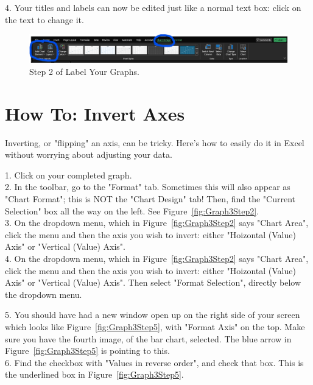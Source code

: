 \documentclass[11pt]{article}
\begin{document}
4. Your titles and labels can now be edited just like a normal text box: click on the text to change it.

\begin{figure}
    \centering
    \includegraphics[width=0.75\linewidth]{Images/2step2.png}
    \caption{Step 2 of Label Your Graphs.}
    \label{fig:Graph2Step2}
\end{figure}


\section{How To: Invert Axes}

Inverting, or "flipping" an axis, can be tricky. Here's how to easily do it in Excel without worrying about adjusting your data.

1. Click on your completed graph. \\

2. In the toolbar, go to the "Format" tab. Sometimes this will also appear as "Chart Format"; this is NOT the "Chart Design" tab! Then, find the "Current Selection" box all the way on the left. See Figure~\ref{fig:Graph3Step2}. \\

3. On the dropdown menu, which in Figure~\ref{fig:Graph3Step2} says "Chart Area", click the menu and then the axis you wish to invert: either "Hoizontal (Value) Axis" or "Vertical (Value) Axis". \\

4. On the dropdown menu, which in Figure~\ref{fig:Graph3Step2} says "Chart Area", click the menu and then the axis you wish to invert: either "Hoizontal (Value) Axis" or "Vertical (Value) Axis". Then select "Format Selection", directly below the dropdown menu.

5. You should have had a new window open up on the right side of your screen which looks like Figure~\ref{fig:Graph3Step5}, with "Format Axis" on the top. Make sure you have the fourth image, of the bar chart, selected. The blue arrow in Figure~\ref{fig:Graph3Step5} is pointing to this. \\

6. Find the checkbox with "Values in reverse order", and check that box. This is the underlined box in Figure~\ref{fig:Graph3Step5}. \\
\end{document}
